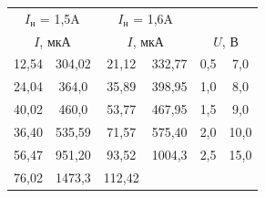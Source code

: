 \documentclass[a4paper,12pt]{article}
\begin{document}
\begin{table}[H]\label{tab: I(U) 3 and 4}
    \centering
    \begin{tabular}{|cc|cc|cc|}
        \hline
        \multicolumn{2}{|c|}{{\color[HTML]{000000} $I_н$ = 1,5A}} &
          \multicolumn{2}{c|}{{\color[HTML]{000000} $I_н$ = 1,6A}} &
          \multicolumn{2}{c|}{{\color[HTML]{000000} }} \\ \cline{1-4}
        \multicolumn{2}{|c|}{{\color[HTML]{000000} $I$, мкА}} &
          \multicolumn{2}{c|}{{\color[HTML]{000000} $I$, мкА}} &
          \multicolumn{2}{c|}{{{\color[HTML]{000000} $U$, В}}} \\ \hline
        \multicolumn{1}{|c|}{{\color[HTML]{000000} 12,54}} &
          {\color[HTML]{000000} 304,02} &
          \multicolumn{1}{c|}{{\color[HTML]{000000} 21,12}} &
          {\color[HTML]{000000} 332,77} &
          \multicolumn{1}{c|}{{\color[HTML]{000000} 0,5}} &
          {\color[HTML]{000000} 7,0} \\ \hline
        \multicolumn{1}{|c|}{{\color[HTML]{000000} 24,04}} &
          {\color[HTML]{000000} 364,0} &
          \multicolumn{1}{c|}{{\color[HTML]{000000} 35,89}} &
          {\color[HTML]{000000} 398,95} &
          \multicolumn{1}{c|}{{\color[HTML]{000000} 1,0}} &
          {\color[HTML]{000000} 8,0} \\ \hline
        \multicolumn{1}{|c|}{{\color[HTML]{000000} 40,02}} &
          {\color[HTML]{000000} 460,0} &
          \multicolumn{1}{c|}{{\color[HTML]{000000} 53,77}} &
          {\color[HTML]{000000} 467,95} &
          \multicolumn{1}{c|}{{\color[HTML]{000000} 1,5}} &
          {\color[HTML]{000000} 9,0} \\ \hline
        \multicolumn{1}{|c|}{{\color[HTML]{000000} 36,40}} &
          {\color[HTML]{000000} 535,59} &
          \multicolumn{1}{c|}{{\color[HTML]{000000} 71,57}} &
          {\color[HTML]{000000} 575,40} &
          \multicolumn{1}{c|}{{\color[HTML]{000000} 2,0}} &
          {\color[HTML]{000000} 10,0} \\ \hline
        \multicolumn{1}{|c|}{{\color[HTML]{000000} 56,47}} &
          {\color[HTML]{000000} 951,20} &
          \multicolumn{1}{c|}{{\color[HTML]{000000} 93,52}} &
          {\color[HTML]{000000} 1004,3} &
          \multicolumn{1}{c|}{{\color[HTML]{000000} 2,5}} &
          {\color[HTML]{000000} 15,0} \\ \hline
        \multicolumn{1}{|c|}{{\color[HTML]{000000} 76,02}} &
          {\color[HTML]{000000} 1473,3} &
          \multicolumn{1}{c|}{{\color[HTML]{000000} 112,42}} &

\end{tabular}
\end{table}
\end{document}

